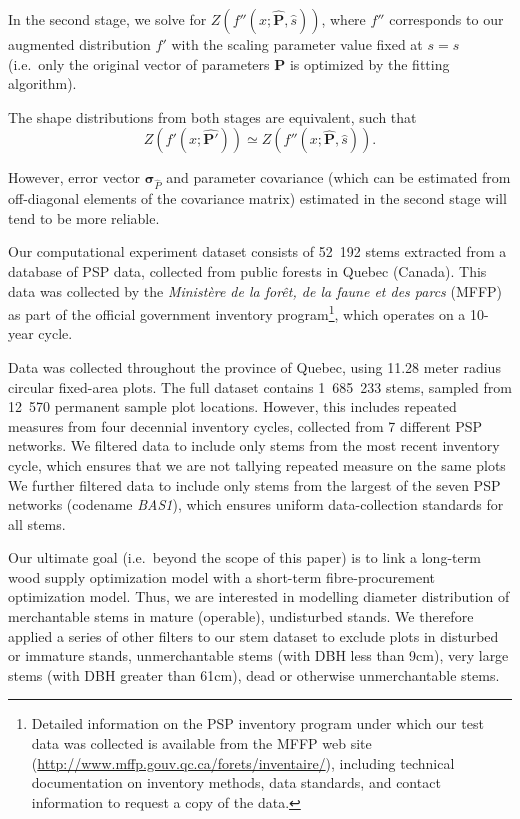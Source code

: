 \message{ !name(pspdistfit_article.tex)}\documentclass{article}
\begin{document}
In the second stage, we solve for  $Z(f''(x; \bm{\hat{P}}, \hat{s}))$, where $f''$ corresponds to our augmented distribution $f'$ with the scaling parameter value fixed at $s = \hat{s}$ (i.e.~only the original vector of parameters $\bm{P}$ is optimized by the fitting algorithm).

The shape distributions from both stages are equivalent, such that
\begin{equation}
 Z(f'(x; \bm{\hat{P'}})) \simeq Z(f''(x; \bm{\hat{P}}, \hat{s})). 
\end{equation}

However, error vector $\bm{\sigma}_{\hat{P}}$ and parameter covariance (which can be estimated from off-diagonal elements of the covariance matrix) estimated in the second stage will tend to be more reliable.


Our computational experiment dataset consists of 52~192 stems extracted from a database of PSP data, collected from public forests in Quebec (Canada). 
This data was collected by the \emph{Ministère de la forêt, de la faune et des parcs} (MFFP) as part of the official government inventory program\footnote{Detailed information on the
  PSP inventory program under which our test data was collected is available from the MFFP web site (\url{http://www.mffp.gouv.qc.ca/forets/inventaire/}), including technical documentation on inventory methods, data standards, and contact information to request a copy of the data.}, which operates on a 10-year cycle.

Data was collected throughout the province of Quebec, using 11.28 meter radius circular fixed-area plots.
The full dataset contains 1~685~233 stems, sampled from 12~570 permanent sample plot locations.
However, this includes repeated measures from four decennial inventory cycles, collected from 7 different PSP networks.
We filtered data to include only stems from the most recent inventory cycle, which ensures that we are not tallying repeated measure on the same plots
We further filtered data to include only stems from the largest of the seven PSP networks (codename \emph{BAS1}), which ensures uniform data-collection standards for all stems.

Our ultimate goal (i.e.~beyond the scope of this paper) is to link a long-term wood supply optimization model with a short-term fibre-procurement optimization model.  
Thus, we are interested in modelling diameter distribution of merchantable stems in mature (operable), undisturbed stands.
We therefore applied a series of other filters to our stem dataset to exclude plots in disturbed or immature stands, unmerchantable stems (with DBH less than 9cm), very large stems (with DBH greater than 61cm), dead or otherwise unmerchantable stems.
\end{document}
